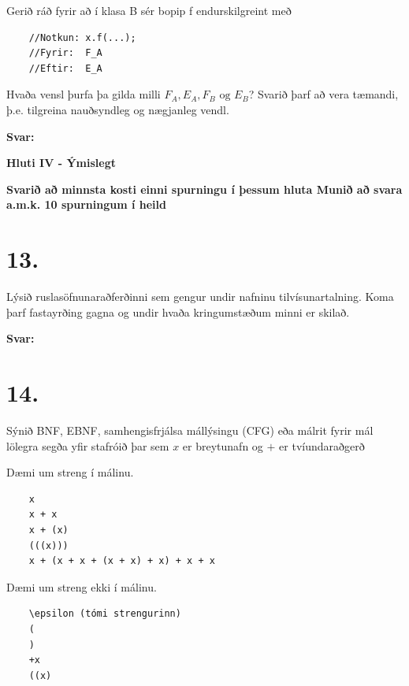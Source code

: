 \documentclass{article}
\newcommand{\sv}{\textbf{Svar:}}
\newcommand{\bo}[1]{\textbf{#1}}
\begin{document}
 Gerið ráð fyrir að í klasa B sér bopip f endurskilgreint með
 \begin{verbatim}
    //Notkun: x.f(...);
    //Fyrir:  F_A
    //Eftir:  E_A
 \end{verbatim}

 Hvaða vensl þurfa þa gilda milli $F_A, E_A, F_B \text{ og } E_B$? Svarið þarf að
 vera tæmandi, þ.e. tilgreina nauðsyndleg og nægjanleg vendl.

 \sv

 \newpage

 \begin{center}
    \bo{Hluti IV - Ýmislegt}


    \bo{Svarið að minnsta kosti einni spurningu í þessum hluta 
    Munið að svara a.m.k. 10 spurningum í heild}
 \end{center}

 \section{13.}
 Lýsið ruslasöfnunaraðferðinni sem gengur undir nafninu 
 tilvísunartalning. Koma þarf fastayrðing gagna og undir hvaða 
 kringumstæðum minni er skilað.


 \sv

 \newpage
 \section{14.}
 Sýnið BNF, EBNF, samhengisfrjálsa mállýsingu (CFG) eða málrit
 fyrir mál lölegra segða yfir stafróið  þar sem $x$ er
 breytunafn og $+$ er tvíundaraðgerð

 Dæmi um streng í málinu.
 \begin{verbatim}
    x
    x + x
    x + (x)
    (((x)))
    x + (x + x + (x + x) + x) + x + x
 \end{verbatim}
 
 Dæmi um streng ekki í málinu.

\begin{verbatim}
    \epsilon (tómi strengurinn)
    (
    )
    +x
    ((x)
 \end{verbatim}
\end{document}
